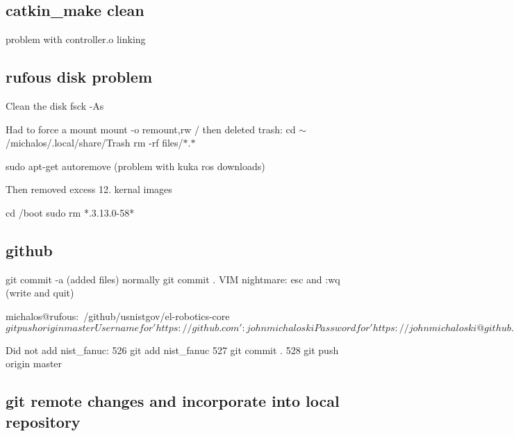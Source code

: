 \subsection*{catkin\-\_\-make clean }

problem with controller.\-o linking

\subsection*{rufous disk problem }

Clean the disk fsck -\/\-As

Had to force a mount mount -\/o remount,rw / then deleted trash\-: cd $\sim$/michalos/.local/share/\-Trash rm -\/rf files/$\ast$.$\ast$

sudo apt-\/get autoremove (problem with kuka ros downloads)

Then removed excess 12. kernal images \begin{DoxyVerb}cd /boot
sudo rm *.3.13.0-58*
\end{DoxyVerb}


\subsection*{github }

git commit -\/a (added files) normally git commit . V\-I\-M nightmare\-: esc and \-:wq (write and quit)

\begin{DoxyVerb}michalos@rufous:~/github/usnistgov/el-robotics-core$ git push origin master
Username for 'https://github.com': johnmichaloski
Password for 'https://johnmichaloski@github.com': 
Counting objects: 10, done.
Delta compression using up to 8 threads.
Compressing objects: 100%
Writing objects: 100%
Total 2 (delta 1), reused 0 (delta 0)
To https://github.com/usnistgov/el-robotics-core
   395d561..b74a274  master -> master
michalos@rufous:~/github/usnistgov/el-robotics-core$ 
\end{DoxyVerb}


Did not add nist\-\_\-fanuc\-: 526 git add nist\-\_\-fanuc 527 git commit . 528 git push origin master

\subsection*{git remote changes and incorporate into local repository }

